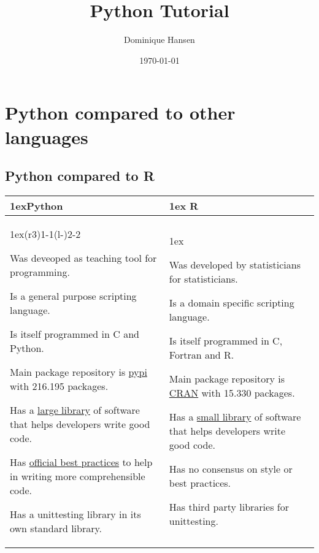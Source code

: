 \documentclass{article}
\title{Python Tutorial}
\author{Dominique Hansen}
\date{\today}
\begin{document}
\maketitle

\section{Python compared to other languages}

\subsection{Python compared to R}

\begin{table}[h]
\begin{tabularx}{\linewidth}{>{\parskip1ex}X@{\kern4\tabcolsep}>{\parskip1ex}X}
\toprule
\hfil\bfseries Python
&
\hfil\bfseries R
\\\cmidrule(r{3\tabcolsep}){1-1}\cmidrule(l{-\tabcolsep}){2-2}

Was deveoped as teaching tool for programming.

Is a general purpose scripting language.

Is itself programmed in C and Python.

Main package repository is \href{https://pypi.org/}{pypi} with 216.195 packages.

Has a \href{https://github.com/mre/awesome-static-analysis\#python}{large library}
of software that helps developers write good code.

Has \href{https://www.python.org/dev/peps/pep-0008/}{official best practices}
to help in writing more comprehensible code.

Has a unittesting library in its own standard library.

&

Was developed by statisticians for statisticians.

Is a domain specific scripting language.

Is itself programmed in C, Fortran and R.

Main package repository is \href{https://cran.r-project.org/}{CRAN} with 15.330 packages.

Has a \href{https://github.com/mre/awesome-static-analysis\#r}{small library}
of software that helps developers write good code.

Has no consensus on style or best practices.

Has third party libraries for unittesting.

\\\bottomrule
\end{tabularx}
\end{table}
\end{document}
